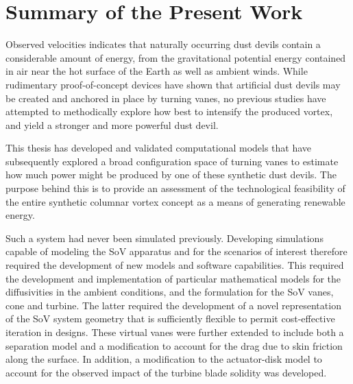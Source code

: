 \label{sec:conclusions}

%
%

%
%

\section{Summary of the Present Work}

%
%

%
%
%

Observed velocities indicates that naturally occurring dust devils
contain a considerable amount of energy, from the gravitational
potential energy contained in air near the hot surface of the Earth 
as well as ambient winds. While rudimentary proof-of-concept devices have shown 
that artificial dust devils may be created and
anchored in place by turning vanes, no previous studies have attempted
to methodically explore how best to intensify the produced vortex,
and yield a stronger and more powerful dust devil. 

This thesis has developed and validated computational models that have
subsequently 
explored a broad configuration space of turning vanes to estimate
how much power might be produced by one of these synthetic dust devils.
The purpose behind this is to provide an assessment of the technological 
feasibility of the entire synthetic columnar vortex concept as a means 
of generating renewable energy. 

Such a system had never been simulated previously. Developing
simulations capable of modeling the SoV apparatus and for the scenarios
of interest therefore required the development of new models and
software capabilities. This required the development and implementation
of particular mathematical models for the diffusivities in the ambient
conditions, and the formulation for the SoV vanes, cone and
turbine. The latter required the development of a novel representation
of the SoV system geometry that is sufficiently flexible to permit
cost-effective iteration in designs. These virtual vanes were
further extended to include both a separation model and a modification to account for 
the drag due to skin friction along the surface. 
In addition, a modification to the actuator-disk model to account 
for the observed impact of the turbine blade solidity was developed. 

